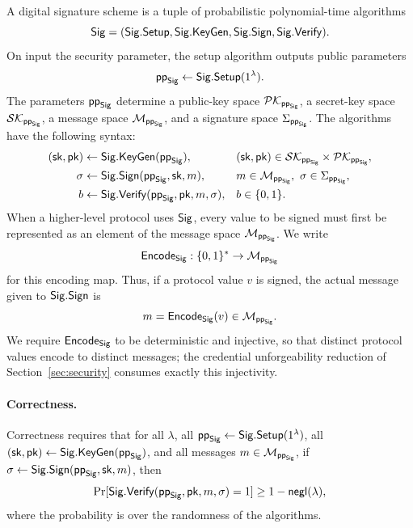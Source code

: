 \begin{definition}
A digital signature scheme is a tuple of probabilistic polynomial-time algorithms
\begin{equation*}
  \Sig=(\Sig.\Setup,\Sig.\KeyGen,\Sig.\Sign,\Sig.\Verify).
\end{equation*}
On input the security parameter, the setup algorithm outputs public parameters
\begin{equation*}
  \ppSig\leftarrow\Sig.\Setup(1^\lambda).
\end{equation*}
The parameters $\ppSig$ determine a public-key space $\PKSig$, a secret-key space $\SKSig$, a message space $\MSig$, and a signature space $\SigmaSig$. The algorithms have the following syntax:
\begin{equation*}
\begin{aligned}
  (\sk,\pk) &\leftarrow \Sig.\KeyGen(\ppSig),
  &&(\sk,\pk)\in\SKSig\times\PKSig,\\
  \sigma &\leftarrow \Sig.\Sign(\ppSig,\sk,m),
  &&m\in\MSig,\ \sigma\in\SigmaSig,\\
  b &\leftarrow \Sig.\Verify(\ppSig,\pk,m,\sigma),
  &&b\in\{0,1\}.
\end{aligned}
\end{equation*}
When a higher-level protocol uses $\Sig$, every value to be signed must first be represented as an element of the message space $\MSig$. We write
\begin{equation*}
  \EncodeSig:\{0,1\}^{\ast}\to\MSig
\end{equation*}
for this encoding map. Thus, if a protocol value $v$ is signed, the actual message given to $\Sig.\Sign$ is
\begin{equation*}
  m=\EncodeSig(v)\in\MSig.
\end{equation*}
We require $\EncodeSig$ to be deterministic and injective, so that distinct protocol values encode to distinct messages; the credential unforgeability reduction of Section~\ref{sec:security} consumes exactly this injectivity.

\paragraph{Correctness.}
Correctness requires that for all $\lambda$, all $\ppSig\leftarrow\Sig.\Setup(1^\lambda)$, all $(\sk,\pk)\leftarrow\Sig.\KeyGen(\ppSig)$, and all messages $m\in\MSig$, if $\sigma\leftarrow\Sig.\Sign(\ppSig,\sk,m)$, then
\begin{equation*}
  \Pr[\Sig.\Verify(\ppSig,\pk,m,\sigma)=1]\geq 1-\negl(\lambda),
\end{equation*}
where the probability is over the randomness of the algorithms.


\end{definition}

